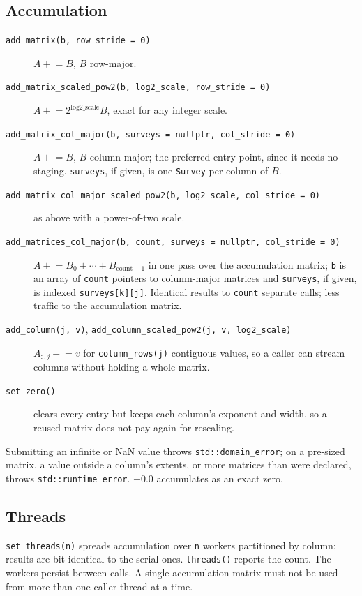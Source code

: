 \documentclass[11pt]{article}
\newcommand{\code}[1]{\texttt{#1}}
\begin{document}
\subsection{Accumulation}
\begin{description}
\item[\code{add\_matrix(b, row\_stride = 0)}] $A \mathrel{+}= B$, $B$ row-major.
\item[\code{add\_matrix\_scaled\_pow2(b, log2\_scale, row\_stride = 0)}] $A \mathrel{+}= 2^{\text{log2\_scale}} B$, exact for any integer scale.
\item[\code{add\_matrix\_col\_major(b, surveys = nullptr, col\_stride = 0)}] $A \mathrel{+}= B$, $B$ column-major; the preferred entry point, since it needs no staging. \code{surveys}, if given, is one \code{Survey} per column of $B$.
\item[\code{add\_matrix\_col\_major\_scaled\_pow2(b, log2\_scale, col\_stride = 0)}] as above with a power-of-two scale.
\item[\code{add\_matrices\_col\_major(b, count, surveys = nullptr, col\_stride = 0)}] $A \mathrel{+}= B_0 + \cdots + B_{\text{count}-1}$ in one pass over the accumulation matrix; \code{b} is an array of \code{count} pointers to column-major matrices and \code{surveys}, if given, is indexed \code{surveys[k][j]}. Identical results to \code{count} separate calls; less traffic to the accumulation matrix.
\item[\code{add\_column(j, v)}, \code{add\_column\_scaled\_pow2(j, v, log2\_scale)}] $A_{:,j} \mathrel{+}= v$ for \code{column\_rows(j)} contiguous values, so a caller can stream columns without holding a whole matrix.
\item[\code{set\_zero()}] clears every entry but keeps each column's exponent and width, so a reused matrix does not pay again for rescaling.
\end{description}
Submitting an infinite or NaN value throws \code{std::domain\_error}; on a pre-sized matrix, a value outside a column's extents, or more matrices than were declared, throws \code{std::runtime\_error}. $-0.0$ accumulates as an exact zero.

\subsection{Threads}
\code{set\_threads(n)} spreads accumulation over \code{n} workers partitioned by column; results are bit-identical to the serial ones. \code{threads()} reports the count. The workers persist between calls. A single accumulation matrix must not be used from more than one caller thread at a time.
\end{document}
